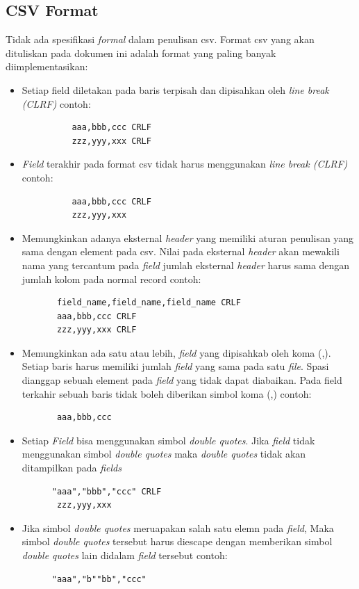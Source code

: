 \subsection{CSV Format}
Tidak ada spesifikasi \textit{formal} dalam penulisan csv. Format csv yang akan dituliskan pada dokumen ini adalah format yang paling banyak diimplementasikan:

\begin{itemize}
    \item Setiap field diletakan pada baris terpisah dan dipisahkan oleh \textit{line break (CLRF)} contoh:
    \begin{lstlisting}
          aaa,bbb,ccc CRLF
          zzz,yyy,xxx CRLF
    \end{lstlisting}
    \item \textit{Field} terakhir pada format csv tidak harus menggunakan \textit{line break (CLRF)} contoh:
        \begin{lstlisting}
          aaa,bbb,ccc CRLF
          zzz,yyy,xxx 
    \end{lstlisting}
    \item Memungkinkan adanya eksternal \textit{header} yang memiliki aturan penulisan yang sama dengan element pada csv. Nilai pada eksternal \textit{header} akan mewakili nama yang tercantum pada \textit{field} jumlah eksternal \textit{header} harus sama dengan jumlah kolom pada normal record contoh:
    \begin{lstlisting}
       field_name,field_name,field_name CRLF
       aaa,bbb,ccc CRLF
       zzz,yyy,xxx CRLF

    \end{lstlisting}
    
    \item Memungkinkan ada satu atau lebih, \textit{field} yang dipisahkab oleh koma (,). Setiap baris harus memiliki jumlah \textit{field} yang sama pada satu \textit{file}. Spasi dianggap sebuah element pada \textit{field} yang tidak dapat diabaikan. Pada field terkahir sebuah baris tidak boleh diberikan simbol koma (,) contoh:
    \begin{lstlisting}
       aaa,bbb,ccc
    \end{lstlisting}
    
    \item Setiap \textit{Field} bisa menggunakan simbol \textit{double quotes}. Jika \textit{field} tidak menggunakan simbol \textit{double quotes} maka \textit{double quotes} tidak akan ditampilkan pada \textit{fields}
    \begin{lstlisting}
      "aaa","bbb","ccc" CRLF
       zzz,yyy,xxx
    \end{lstlisting}
    
    \item Jika simbol \textit{double quotes} meruapakan salah satu elemn pada \textit{field}, Maka simbol \textit{double quotes} tersebut harus diescape dengan memberikan simbol \textit{double quotes} lain didalam \textit{field} tersebut contoh:
    \begin{lstlisting}
      "aaa","b""bb","ccc"
    \end{lstlisting}
\end{itemize}

